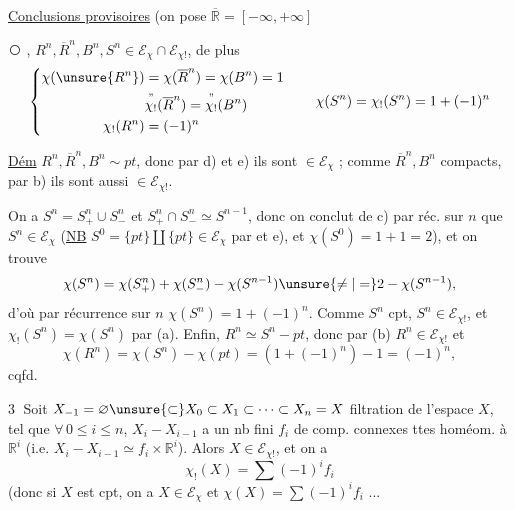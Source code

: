 
\uline{Conclusions provisoires} (on pose $\overline{\mathbb{R}}=[-\infty,+\infty]$


\textcircled{} , $R^n,\overline{R}^n,B^n,S^n\in\mathcal{E}_{\chi}\cap\mathcal{E}_{\chi!}$, de plus
\[
\left\{\begin{aligned}
\chi(\unsure{R^n})&=\chi(\overline{R}^n)=\chi(B^n)=1\\
&\overset{\text{''}}{\chi_!}(\overline{R}^n)=\overset{\text{''}}{\chi_!}(B^n)\\
\chi_!(R^n)&=(-1)^n
\end{aligned}\right.
\qquad
\chi(S^n)=\chi_!(S^n)=1+(-1)^n
\]

\uline{Dém} $R^n,\overline{R}^n,B^n\sim pt$, donc par d) et e) ils sont $\in\mathcal{E}_{\chi}$ ; comme $\overline{R}^n,B^n$ compacts, par b) ils sont aussi $\in\mathcal{E}_{\chi!}$.

On a $S^n=S^n_+\cup S^n_-$ et $S^n_+\cap S^n_-\simeq S^{n-1}$,  donc on conclut de c) par réc. sur $n$ que $S^n\in\mathcal{E}_{\chi}$ (\uline{NB} $S^0=\{pt\}\amalg\{pt\}\in\mathcal{E}_{\chi}$ par  et e), et $\chi(S^0)=1+1=2$), et on trouve
\[
\chi(S^n)=\chi(S^n_+)+\chi(S^n_-)-\chi(S^{n-1})\unsure{\ne|=}2-\chi(S^{n-1}),
\]
d'où par récurrence sur $n$ $\chi(S^n)=1+(-1)^n$. Comme $S^n$ cpt, $S^n\in\mathcal{E}_{\chi!}$, et $\chi_!(S^n)=\chi(S^n)$ par (a). Enfin, $R^n\simeq S^n-pt$, donc par (b) $R^n\in\mathcal{E}_{\chi!}$ et
\[
\chi(R^n)=\chi(S^n)-\chi(pt)=(1+(-1)^n)-1=(-1)^n,
\]
cqfd.

\textcircled{3} Soit $X_{-1}=\varnothing\unsure{\subset}X_0\subset X_1\subset\cdots\subset X_n=X$ filtration de l'espace $X$, tel que $\forall\,0\leq i\leq n$, $X_i-X_{i-1}$  a un nb fini $f_i$ de comp. connexes ttes homéom. à $\mathbb{R}^i$ (i.e. $X_i-X_{i-1}\simeq f_i\times\mathbb{R}^i$). Alors $X\in\mathcal{E}_{\chi!}$, et on a
\[
\chi_!(X)=\sum(-1)^i f_i
\]
(donc si $X$ est cpt, on a $X\in\mathcal{E}_{\chi}$ et $\chi(X)=\sum(-1)^i f_i$ ...

